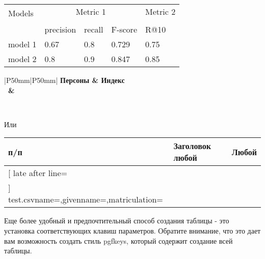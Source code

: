\begin{table}[h]
	\centering
	\begin{tabular}{lllll}
		\toprule
		\multirow{2}{*}[-1em]{Models} & \multicolumn{3}{c}{Metric 1} & Metric 2\\
		\addlinespace[10pt]
		\cmidrule(lr){2-4} \cmidrule(lr){5-5} \\
		{} & precision & recall & F-score  & R@10 \\
		\midrule
		model 1 & 0.67  & 0.8 & 0.729  & 0.75 \\
		model 2 & 0.8 & 0.9 & 0.847 & 0.85 \\
		\bottomrule
	\end{tabular}
\end{table}





\begin{landscape}
{\tiny	
{}
}
\end{landscape}




%



\begin{tabular}{|P{50mm}|P{50mm}|}\hline%
	\bfseries Персоны  & \bfseries Индекс%
%	
	{\\\givenname\  \name & \matriculation \,  \matriculation}%
	

%	
	\\\hline
%	
\end{tabular}

Или


\begin{longtable}{|p{10mm}|p{55mm}|p{40mm}|}\hline%
п/п	& Заголовок любой & Любой\\\hline\hline

	\csvreader[%
	late after line=\\\hline]%
	{test.csv}{name=\name,givenname=\firstname,matriculation=\matnumber}%
	{\thecsvrow & \firstname~\name & \matnumber}%

\end{longtable}



Еще более удобный и предпочтительный способ создания таблицы - это установка соответствующих клавиш параметров. Обратите внимание, что это дает вам возможность создать стиль pgfkeys, который содержит создание всей таблицы.

